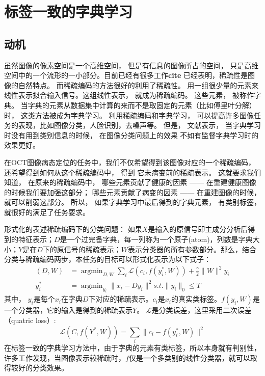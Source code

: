 \section{标签一致的字典学习}
\label{sec:lc-ksvd}
    \subsection{动机}
    虽然图像的像素空间是一个高维空间， 但是有信息的图像所占的空间， 只是高维空间中的一个流形的一小部分。目前已经有很多工作\textbf{cite} 已经表明，稀疏性是图像的自然特点。 而稀疏编码的方法很好的利用了稀疏性。 用一组很少量的元素来线性表示拟合输入信号。这组线性表示， 就成为稀疏编码。 这些元素， 被称作字典。 当字典的元素从数据集中计算的来而不是取固定的元素（比如傅里叶分解）时， 这类方法被成为字典学习。  利用稀疏编码和字典学习， 可以提高许多图像任务的表现，比如图像分类\cite{lazebnik2006beyond,gao2010kernel}，人脸识别\cite{zhang2010discriminative,wright2009robust}，去噪声\cite{elad2006image, dong2013nonlocally, dong2014learning}等。  但是， 文献表示， 当字典学习时没有用到类别信息的时候，  在图像分类问题上的效果 不如有监督字典学习时的效果更好。 

    在OCT图像病态定位的任务中，我们不仅希望得到该图像对应的一个稀疏编码， 还希望得到如何从这个稀疏编码中， 得到 它未病变前的稀疏表示。 这就要求我们 知道， 在原来的稀疏编码中， 哪些元素贡献了健康的因素 —— 在重建健康图像的时候我们要加强这部分； 哪些元素贡献了病变的因素 —— 在重建图像的时候， 就可以削弱这部分。  所以， 如果字典学习中最后得到的字典元素， 有类别标签\cite{jiang2013label}， 就很好的满足了任务要求。

    形式化的表述稀疏编码下的分类问题：    
    如果$X$是输入的原信号即主成分分析后得到的特征表示；$D$是一个过完备字典，每一列称为一个原子(atom)，列数是字典大小；$Y$是在$D$下的原信号的稀疏表示；$W$表示分类器的所有参数部分。那么，结合分类与稀疏编码两步，本任务的目标可以形式化表示为以下式子\cite{jiang2013label}：
    \begin{align}
        (D, W) & = \mathop{\arg \min}_{D, W} \sum_i \mathcal{L} (c_i, f(y_i^*, W)) + \frac{\gamma}{2}\|W\| ^2
        y_i \\
        y_i^* & = \mathop{\arg \min}_{y_i} \|x_i - Dy_i\| ^2 s.t. \|y_i\|_0 \le T \label{alg:line:ksvd-over2}
    \end{align}
    其中， $y_i$是每个$x_i$在字典$D$下对应的稀疏表示。$c_i$是$x_i$的真实类标签。$f(y_i, W)$是一个分类器，它的输入是得到的稀疏表示$Y$。 $\mathcal{L}$是分类误差，这里采用二次误差（quatric loss）:
    \begin{equation}
        \mathcal{L}(C, f(Y^*, W)) = \sum _i \|c_i - f(y_i^* , W) \| ^2 
    \end{equation}
    在标签一致的字典学习方法中，由于字典的元素有类标签，所以本身就有判别性，许多工作\cite{jiang2013label,yang2009linear}发现，当图像表示较稀疏时，$f$仅是一个多类别的线性分类器，就可以取得较好的分类效果。

